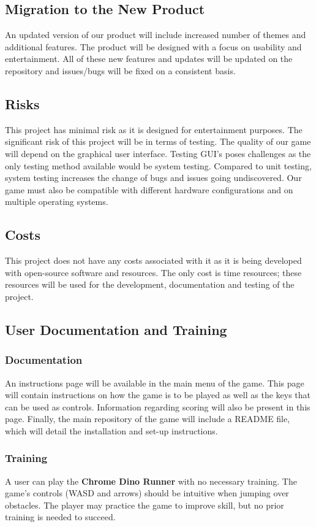 \documentclass[12pt]{article}
\begin{document}
\subsection{Migration to the New Product}
An updated version of our product will include increased number of themes and additional features. The product will be designed with a focus on usability and entertainment. All of these new features and updates will be updated on the repository and issues/bugs will be fixed on a consistent basis. 

\subsection{Risks}
This project has minimal risk as it is designed for entertainment purposes. The significant risk of this project will be in terms of testing. The quality of our game will depend on the graphical user interface. Testing GUI’s poses challenges as the only testing method available would be system testing. Compared to unit testing, system testing increases the change of bugs and issues going undiscovered. Our game must also be compatible with different hardware configurations and on multiple operating systems.
\subsection{Costs}
This project does not have any costs associated with it as it is being developed with open-source software and resources. The only cost is time resources; these resources will be used for the development, documentation and testing of the project. 
\subsection{User Documentation and Training}
\subsubsection{Documentation}
An instructions page will be available in the main menu of the game.
This page will contain instructions on how the game is to be played as well as the keys that can be used as controls. Information regarding scoring will also be present in this page.
Finally, the main repository of the game will include a README file, which will detail the installation and set-up instructions.
\subsubsection{Training}
A user can play the \textbf{Chrome Dino Runner} with no necessary training. The game's controls (WASD and arrows) should be intuitive when jumping over obstacles. The player may practice the game to improve skill, but no prior training is needed to succeed.  
\end{document}
